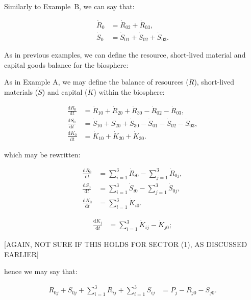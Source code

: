 Similarly to Example~B, we can say that:

\begin{align}
\label{eq:C_R0}
	\dot{R}_{0} 										&
	= \dot{R}_{02}
	+ \dot{R}_{03},									\\
\label{eq:B_S0}
	\dot{S}_{0} 										&
	= \dot{S}_{01} 
	+ \dot{S}_{02}
	+ \dot{S}_{03}.
\end{align}

As in previous examples,
we can define the resource, 
short-lived material and capital goods balance for
the biosphere:

As in Example A, we may define 
the balance of resources ($\dot{R}$),
short-lived materials ($\dot{S}$) and
capital ($\dot{K}$) within the biosphere:

\begin{align}\label{eq:C_dR0}
	\frac{\mathrm{d}R_{0}}{\mathrm{d}t}	&
	= \dot{R}_{10}
	+ \dot{R}_{20}
	+ \dot{R}_{30}
	- \dot{R}_{02}
	- \dot{R}_{03},										\\
\label{eq:C_dS0}
	\frac{\mathrm{d}S_{0}}{\mathrm{d}t}	&
	= \dot{S}_{10}
	+ \dot{S}_{20}
	+ \dot{S}_{30}	
	- \dot{S}_{01}
	- \dot{S}_{02}
	- \dot{S}_{03},										\\	
\label{eq:C_dK0}
	\frac{\mathrm{d}K_{0}}{\mathrm{d}t}	&
	= \dot{K}_{10}
	+ \dot{K}_{20}
	+ \dot{K}_{30}.
\end{align}

\noindent{}which may be rewritten:

\begin{align}
\label{eq:C_dR0a}
	\frac{\mathrm{d}R_{0}}{\mathrm{d}t}	&
	= \sum_{i = 1}^{3}\dot{R}_{i0}
	- \sum_{j = 1}^{3}\dot{R}_{0j},				\\
\label{eq:C_dS0a}
	\frac{\mathrm{d}S_{0}}{\mathrm{d}t}	&
	= \sum_{i = 1}^{3}\dot{S}_{i0}
	- \sum_{j = 1}^{3}\dot{S}_{0j},				\\
\label{eq:C_dK0a}
	\frac{\mathrm{d}K_{0}}{\mathrm{d}t}	&
	= \sum_{i = 1}^{3}\dot{K}_{i0}.
\end{align}

\begin{align} \label{eq:C_CV_K_balance}
	\frac{\mathrm{d}K_{j}}{\mathrm{d}t}		
	& =  \sum_{i = 1}^{3}\dot{K}_{ij}
	- \dot{K}_{j0};
\end{align}

[AGAIN, NOT SURE IF THIS HOLDS FOR SECTOR (1), AS DISCUSSED EARLIER]

\noindent hence we may say that:

\begin{align} \label{eq:C_CV_1_to_3_c}
	\dot{R}_{0j} 
	+ \dot{S}_{0j}
	+ \sum_{i = 1}^{3}\dot{R}_{ij}
	+ \sum_{i = 1}^{3}\dot{S}_{ij}
	& = \dot{P}_{j}
	- \dot{R}_{j0} 
	- \dot{S}_{j0}.
\end{align}

